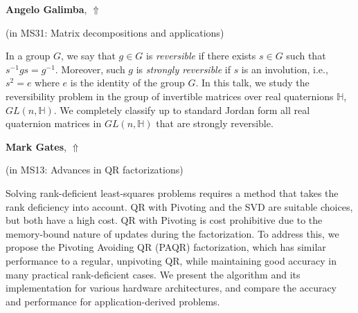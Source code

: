 \documentclass[ILAS2025-program.tex]{subfiles}
\begin{document}
\hypertarget{down0274}{}\begin{ilasabstract}
    
\textbf{Angelo Galimba},  \hfill \hyperlink{up0274}{$\Uparrow$}
    
    
(in {\color{mstitle}MS31: Matrix decompositions and applications})
        
\mtskip
    In a group $G$, we say that $g \in G$ is \emph{reversible} if there exists $s \in G$ such that $s^{-1}gs = g^{-1}$. Moreover, such $g$ is \emph{strongly reversible} if $s$ is an involution, i.e., $s^2 = e$ where $e$ is the identity of the group $G$. In this talk, we study the reversibility problem in the group of invertible matrices over real quaternions $\mathbb{H}$, $GL(n, \mathbb{H})$. We completely classify up to standard Jordan form all real quaternion matrices in $GL(n,\mathbb{H})$ that are strongly reversible.
\end{ilasabstract}
    

\hypertarget{down0341}{}\begin{ilasabstract}
    
\textbf{Mark Gates},  \hfill \hyperlink{up0341}{$\Uparrow$}
    
    
(in {\color{mstitle}MS13: Advances in QR factorizations})
        
\mtskip
    Solving rank-deficient least-squares problems requires a method that
takes the rank deficiency into account. QR with Pivoting and the SVD are
suitable choices, but both have a high cost. QR with Pivoting is cost
prohibitive due to the memory-bound nature of updates during the
factorization. To address this, we propose the Pivoting Avoiding QR (PAQR)
factorization, which has similar performance to a regular,
unpivoting QR, while maintaining good accuracy in many practical
rank-deficient cases. We present the algorithm and its implementation
for various hardware architectures, and compare the accuracy and
performance for application-derived problems.
\end{ilasabstract}
    
\end{document}
